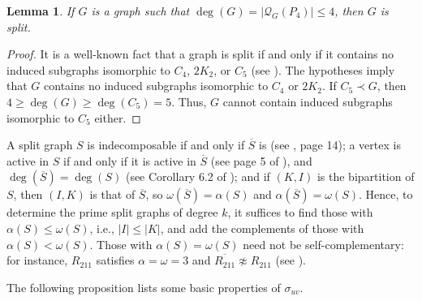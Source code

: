 \documentclass[11pt]{article}
\newtheorem{theorem}{Theorem}[section]
\newtheorem{corollary}[corollary]{Corollary}
\newtheorem{lemma}[lemma]{Lemma}
\begin{document}
\begin{lemma}
	\label{5>degG=|{P_4}|.implica.G.split}
	If $G$ is a graph such that $\deg(G)=|\mathcal{Q}_G(P_4)| \leq 4$, then $G$ is split.
\end{lemma}

\begin{proof}
	It is a well-known fact that a graph is split if and only if it contains no induced subgraphs isomorphic to $C_4$, $2K_2$, or $C_5$ (see \cite{hammer1977split}). The hypotheses imply that $G$ contains no induced subgraphs isomorphic to $C_4$ or $2K_2$. If $C_5 \prec G$, then $4 \geq \deg(G) \geq \deg(C_5)=5$.
	Thus, $G$ cannot contain induced subgraphs isomorphic to $C_5$ either.
\end{proof}



A split graph $S$ is indecomposable if and only if $\overline{S}$ is (see
\cite{tyshkevich2000decomposition}, page 14); a vertex is active in $S$ if
and only if it is active in $\overline{S}$ (see page 5 of \cite{pastine20252}),
and $\deg(\overline{S})=\deg(S)$ (see Corollary 6.2 of \cite{pastine20252});
and if $(K,I)$ is the bipartition of $S$, then $(I,K)$ is that of
$\overline{S}$, so $\omega(\overline{S})=\alpha(S)$ and
$\alpha(\overline{S})=\omega(S)$. Hence, to determine the prime split graphs
of degree $k$, it suffices to find those with $\alpha(S)\leq\omega(S)$, i.e.,
$|I|\leq|K|$, and add the complements of those with $\alpha(S)<\omega(S)$.
Those with $\alpha(S)=\omega(S)$ need not be self-complementary: for
instance, $R_{211}$ satisfies $\alpha=\omega=3$ and
$\overline{R_{211}}\not\approx R_{211}$ (see ).


The following proposition lists some basic properties of $\sigma_{uv}$.
\end{document}
